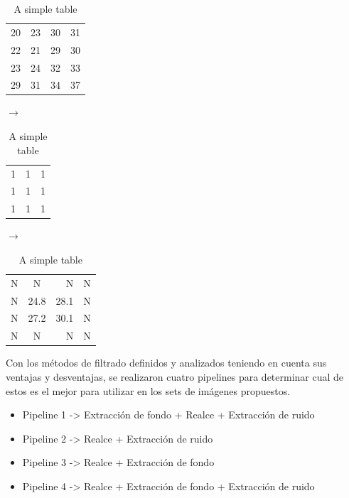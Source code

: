 \begin{table}[!ht]
  \begin{center}
    \begin{tabular}{| l c r c |}
    \hline
    20 & 23 & 30 & 31 \\
    22 & 21 & 29 & 30\\
    23 & 24 & 32 & 33\\
    29 & 31 & 34 & 37\\
    \hline
    \end{tabular}
  \end{center}
  \caption{A simple table}
\end{table}
$\longrightarrow$
\begin{table}[!ht]
  \begin{center}
    \begin{tabular}{| l c r |}
    \hline
    1 & 1 & 1 \\
    1 & 1 & 1 \\
    1 & 1 & 1 \\
    \hline
    \end{tabular}
  \end{center}
  \caption{A simple table}
\end{table}
$\longrightarrow$
\begin{table}[!ht]
  \begin{center}
    \begin{tabular}{| l c r c |}
    \hline
    N & N & N & N \\
    N & 24.8 & 28.1 & N\\
    N & 27.2 & 30.1 & N\\
    N & N & N & N\\
    \hline
    \end{tabular}
  \end{center}
  \caption{A simple table}
\end{table}



Con los métodos de filtrado definidos y analizados teniendo en cuenta sus ventajas y desventajas, se realizaron cuatro pipelines para determinar cual de estos es el mejor para utilizar en los sets de im\'agenes propuestos.

\begin{itemize}
	    \item Pipeline 1 -> Extracci\'on de fondo  +  Realce  +  Extracci\'on de ruido
		\item Pipeline 2 -> Realce +  Extracci\'on de ruido
		\item Pipeline 3 -> Realce +  Extracci\'on de fondo
		\item Pipeline 4 -> Realce  + Extracci\'on de fondo   +  Extracci\'on de ruido
\end{itemize}


